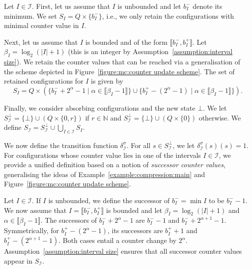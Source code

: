 \documentclass[a4paper,UKenglish,cleveref,autoref,thm-restate,colorlinks]{lipics-v2021}
\newcommand{\integerInterval}[1]{\llbracket{}#1\rrbracket{}}
\newcommand{\IN}{\mathbb{N}}
\newcommand{\mdpStateSpace}{S}
\newcommand{\mdpTrans}{\delta}
\newcommand{\ocStateSpace}{Q}
\newcommand{\ocConfig}{s}
\newcommand{\counterUB}{r}
\newcommand{\intPart}{\mathcal{I}}
\newcommand{\interval}{I}
\newcommand{\intBound}{b}
\newcommand{\intLB}{\intBound^-}
\newcommand{\intUB}{\intBound^+}
\newcommand{\powerIndex}{\alpha}
\newcommand{\powerMax}{\beta}
\newcommand{\compressChainStateSpace}{\mdpStateSpace_{\intPart}}
\newcommand{\compressChainStateSpaceJ}{\mdpStateSpace_{\interval}}
\newcommand{\compressChainStateSpaceStar}{\mdpStateSpace_{\intPart}^{\bot}}
\newcommand{\compressChainTransTemplate}[2]{\mdpTrans^{#1}_{#2}}
\newcommand{\compressChainTrans}{\compressChainTransTemplate{\strat}{\intPart}}
\newcommand{\stratGeneric}[1]{{\sigma_{#1}}}
\newcommand{\strat}{\stratGeneric{}}
\begin{document}
Let $\interval\in\intPart$.
First, let us assume that $\interval$ is unbounded and let $\intLB_\interval$ denote its minimum.
We set $\compressChainStateSpaceJ = \ocStateSpace\times\{\intLB_\interval\}$, i.e., we only retain the configurations with minimal counter value in $\interval$.


Next, let us assume that $\interval$ is bounded and of the form $\integerInterval{\intLB_\interval, \intUB_\interval}$.
Let $\powerMax_\interval=\log_2(|\interval|+1)$ (this is an integer by Assumption~\ref{assumption:interval size}).
We retain the counter values that can be reached via a generalisation of the scheme depicted in Figure~\ref{figure:mc:counter update scheme}.
The set of retained configurations for $\interval$ is given by
\[ \compressChainStateSpaceJ = \ocStateSpace \times \left(
  \{\intLB_\interval + 2^{\powerIndex} - 1 \mid
  \powerIndex\in\integerInterval{\powerMax_\interval-1}\}\cup
  \{\intUB_\interval - (2^{\powerIndex} - 1) \mid
  \powerIndex\in\integerInterval{\powerMax_\interval-1}\}
\right).\]


Finally, we consider absorbing configurations and the new state $\bot$.
We let $\compressChainStateSpaceStar = \{\bot\}\cup (\ocStateSpace\times\{0, \counterUB\})$ if $\counterUB\in\IN$ and $\compressChainStateSpaceStar = \{\bot\}\cup (\ocStateSpace\times\{0\})$ otherwise.
We define $\compressChainStateSpace = \compressChainStateSpaceStar\cup\bigcup_{\interval\in\intPart}\compressChainStateSpaceJ$.


We now define the transition function $\compressChainTrans$.
For all $\ocConfig\in\compressChainStateSpaceStar$, we let $\compressChainTrans(\ocConfig)(\ocConfig)=1$.
For configurations whose counter value lies in one of the intervals $\interval\in\intPart$, we provide a unified definition based on a notion of \textit{successor counter values}, generalising the ideas of Example~\ref{example:compression:main} and Figure~\ref{figure:mc:counter update scheme}.


Let $\interval\in\intPart$.
If $\interval$ is unbounded, we define the successor of $\intLB_\interval=\min\interval$ to be $\intLB_\interval-1$.
We now assume that $\interval = \integerInterval{\intLB_\interval, \intUB_\interval}$ is bounded and let $\powerMax_\interval=\log_2(|\interval|+1)$ and $\powerIndex\in\integerInterval{\powerMax_\interval-1}$.
The successors of $\intLB_\interval + 2^{\powerIndex}-1$ are $\intLB_\interval-1$ and $\intLB_\interval + 2^{\powerIndex+1}-1$.
Symmetrically, for $\intUB_\interval - (2^{\powerIndex}-1)$, its successors are $\intUB_\interval+1$ and $\intUB_\interval - (2^{\powerIndex+1}-1)$.
Both cases entail a counter change by $2^\powerIndex$.
Assumption~\ref{assumption:interval size} ensures that all successor counter values appear in $\compressChainStateSpace$.
\end{document}
